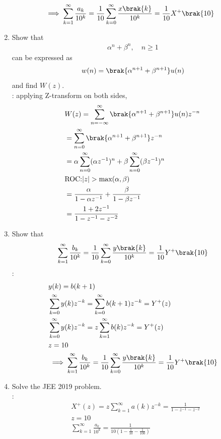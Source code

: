 \documentclass[journal,12pt,twocolumn]{IEEEtran}
\renewcommand\thesection{\arabic{section}}
\begin{document}
\begin{enumerate}[label=\thesection.\arabic*,ref=\thesection.\theenumi]
\begin{align}
&\implies \sum_{k=1}^{\infty}\frac{a_k}{10^k}= 
	\frac{1}{10}\sum_{k=0}^{\infty}\frac{x\brak{k}}{10^k} =\frac{1}{10}X^{+}\brak{{10}}
\end{align}
 \item Show that 
\begin{align}
	\alpha^n + \beta^n, \quad n \ge 1
\end{align}
can be expressed as 
\begin{align}
	w(n) =\brak{\alpha^{n+1} + \beta^{n+1}}u(n)
\end{align}
		and find $W(z)$.\\
\solution:
	applying Z-transform on both sides,
	\begin{align}
	&W(z)=\sum_{n=-\infty}^{\infty}\brak{\alpha^{n+1} + \beta^{n+1}}u(n)z^{-n}\\
	&=\sum_{n=0}^{\infty}\brak{\alpha^{n+1} + \beta^{n+1}}z^{-n}\\
	&=\alpha \sum_{n=0}^{\infty}(\alpha z^{-1})^{n}+\beta \sum_{n=0}^{\infty} (\beta z^{-1})^{n}\\
	&\text{ROC:} |z|>\text{max}(\alpha,\beta)\\
	&=\frac{\alpha}{1-\alpha z^{-1}}+\frac{\beta}{1-\beta z^{-1}}\\
	&=\frac{1+2z^{-1}}{1-z^{-1}-z^{-2}}
	\end{align}
 \item Show that 
\begin{align}
	\sum_{k=1}^{\infty}\frac{b_k}{10^k} =
	\frac{1}{10}\sum_{k=0}^{\infty}\frac{y\brak{k}}{10^k} =\frac{1}{10}Y^{+}\brak{{10}}
\end{align}
\solution:
\begin{align}
&y(k)=b(k+1)\\
&\sum_{k=0}^{\infty} y(k) z^{-k}=\sum_{k=0}^{\infty} b(k+1) z^{-k}=Y^{+}(z)\\
&\sum_{k=0}^{\infty} y(k) z^{-k}=z\sum_{k=1}^{\infty} b(k) z^{-k}=Y^{+}(z)\\
&z=10\\
&\implies \sum_{k=1}^{\infty}\frac{b_k}{10^k} =
	\frac{1}{10}\sum_{k=0}^{\infty}\frac{y\brak{k}}{10^k} =\frac{1}{10}Y^{+}\brak{{10}}
\end{align}
\item Solve the JEE 2019 problem.\\
\solution:
 \begin{align}
&X^{+}(z)=z\sum_{k=1}^{\infty} a(k) z^{-k}=\frac{1}{1-z^{-1}-z^{-2}}\\
&z=10\\
&\sum_{k=1}^{\infty} \frac{a_k}{10^k}=\frac{1}{10 \left(1-\frac{1}{10}-\frac{1}{100}\right)}\\

\end{align}
\end{enumerate}
\end{document}
